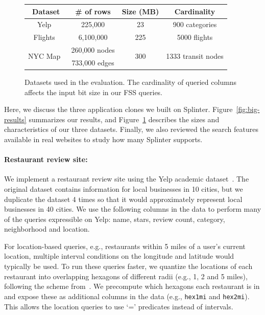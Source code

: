 \begin{figure}
	\centering
		\begin{tabular}{cccc}
			\toprule
			\bf Dataset & \bf \# of rows & \bf Size (MB) & \bf Cardinality \\
			\midrule
			Yelp~\cite{yelp-data} & 225,000 & 23 & 900 categories \\
			\midrule
			Flights~\cite{enigma} & 6,100,000 & 225 & 5000 flights \\
			\midrule
			\multirow{2}{*}{NYC Map~\cite{dimacs}} & 260,000 nodes & \multirow{2}{*}{300} & \multirow{2}{*}{1333 transit nodes}\\
			& 733,000 edges & \\
			\bottomrule
		\end{tabular}
	\caption[Datasets used in the evaluation.]{Datasets used in the evaluation. The cardinality of queried columns affects the input bit size in our FSS queries.}
	\label{fig:datasets}
\end{figure}

Here, we discuss the three application clones
we built on Splinter. Figure~\ref{fig:big-results}
summarizes our results, and Figure~\ref{fig:datasets}
describes the sizes and characteristics of our three datasets.
Finally, we also reviewed the search features available in real websites
to study how many Splinter supports.

\paragraph{Restaurant review site:}
We implement a restaurant review site using the Yelp academic dataset~\cite{yelp-data}.
The original dataset contains information for local businesses in 10 cities, 
but we duplicate the dataset 4 times so that it would approximately represent
local businesses in 40 cities.
We use the following columns in the data
to perform many of the queries expressible on Yelp:
name, stars, review count, category, neighborhood and location.

For location-based queries, 
e.g., restaurants within 5 miles of a user's current location, 
multiple interval conditions on the longitude 
and latitude would typically be used. 
To run these queries faster, we quantize the locations of each restaurant into
overlapping hexagons of different radii (e.g., 1, 2 and 5 miles), following
the scheme from~\cite{narayanan2011location}.
We precompute which hexagons each restaurant is in and expose these as
additional columns in the data (e.g., \texttt{hex1mi} and \texttt{hex2mi}).
This allows the location queries to use `=' predicates instead of intervals.

